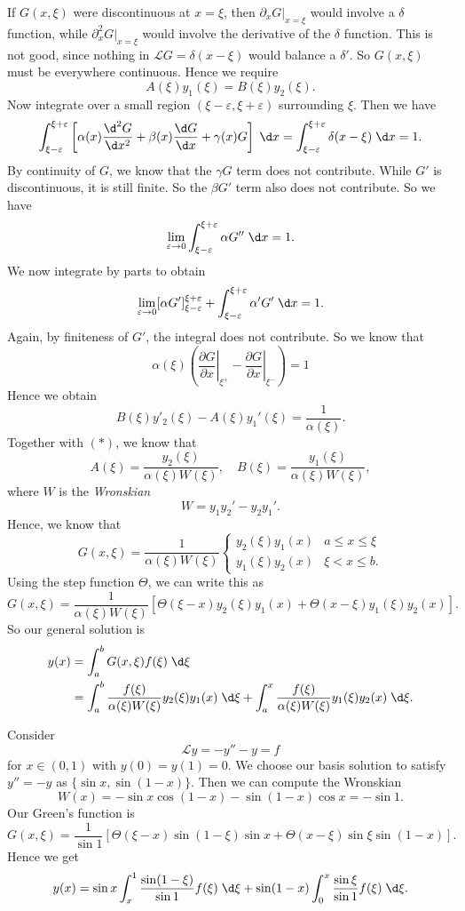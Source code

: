 \documentclass[a4paper]{article}
\begin{document}
If $G(x, \xi)$ were discontinuous at $x = \xi$, then $\partial_x G|_{x = \xi}$ would involve a $\delta$ function, while $\partial^2_x G|_{x = \xi}$ would involve the derivative of the $\delta$ function. This is not good, since nothing in $\mathcal{L}G = \delta(x - \xi)$ would balance a $\delta'$. So $G(x, \xi)$ must be everywhere continuous. Hence we require
\[
  A(\xi) y_1 (\xi) = B(\xi) y_2(\xi).\tag{$*$}
\]
Now integrate over a small region $(\xi - \varepsilon, \xi + \varepsilon)$ surrounding $\xi$. Then we have
\[
  \int_{\xi - \varepsilon}^{\xi + \varepsilon} \left[\alpha(x) \frac{\d^2 G}{\d x^2} + \beta(x) \frac{\d G}{\d x} + \gamma(x) G\right]\;\d x = \int_{\xi - \varepsilon}^{\xi + \varepsilon} \delta(x - \xi)\;\d x = 1.
\]
By continuity of $G$, we know that the $\gamma G$ term does not contribute. While $G'$ is discontinuous, it is still finite. So the $\beta G'$ term also does not contribute. So we have
\[
  \lim_{\varepsilon \to 0} \int_{\xi - \varepsilon}^{\xi + \varepsilon} \alpha G'' \;\d x = 1.
\]
We now integrate by parts to obtain
\[
  \lim_{\varepsilon \to 0} [\alpha G']^{\xi + \varepsilon}_{\xi - \varepsilon} + \int_{\xi - \varepsilon}^{\xi + \varepsilon} \alpha' G' \;\d x = 1.
\]
Again, by finiteness of $G'$, the integral does not contribute. So we know that
\[
  \alpha(\xi)\left(\left.\frac{\partial G}{\partial x}\right|_{\xi^+} - \left.\frac{\partial G}{\partial x}\right|_{\xi^-}\right) = 1
\]
Hence we obtain
\[
  B(\xi) y'_2 (\xi) - A(\xi) y_1'(\xi) = \frac{1}{\alpha(\xi)}.
\]
Together with $(*)$, we know that
\[
  A(\xi) = \frac{y_2(\xi)}{\alpha(\xi) W(\xi)},\quad B(\xi) = \frac{y_1(\xi)}{\alpha(\xi)W(\xi)},
\]
where $W$ is the \emph{Wronskian}
\[
  W = y_1 y_2' - y_2y_1'.
\]
Hence, we know that
\[
  G(x, \xi) = \frac{1}{\alpha(\xi)W(\xi)}
  \begin{cases}
    y_2(\xi) y_1(x) & a \leq x \leq \xi\\
    y_1(\xi) y_2(x) & \xi < x \leq b.
  \end{cases}
\]
Using the step function $\Theta$, we can write this as
\[
  G(x, \xi) = \frac{1}{\alpha(\xi)W(\xi)} [\Theta (\xi - x) y_2(\xi)y_1(x) + \Theta(x - \xi)y_1(\xi)y_2(x)].
\]
So our general solution is
\begin{align*}
  y(x) &= \int_a^b G(x, \xi) f(\xi)\;\d \xi\\
  &= \int_a^b \frac{f(\xi)}{\alpha(\xi)W(\xi)} y_2(\xi) y_1(x)\;\d \xi + \int_a^x \frac{f(\xi)}{\alpha(\xi)W(\xi)}y_1(\xi) y_2(x)\;\d \xi.
\end{align*}

\begin{eg}
  Consider
  \[
    \mathcal{L}y= -y'' - y = f
  \]
  for $x \in (0, 1)$ with $y(0) = y(1) = 0$. We choose our basis solution to satisfy $y'' = -y$ as $\{\sin x, \sin (1 - x)\}$. Then we can compute the Wronskian
  \[
    W(x) = -\sin x \cos(1 - x) - \sin (1 - x) \cos x = -\sin 1.
  \]
  Our Green's function is
  \[
    G(x, \xi) = \frac{1}{\sin 1}[\Theta(\xi - x) \sin (1 - \xi) \sin x + \Theta(x - \xi) \sin \xi \sin (1 - x)].
  \]
  Hence we get
  \[
    y(x) = \sin x \int_{x}^1 \frac{\sin (1 - \xi)}{ \sin 1}f(\xi) \;\d \xi + \sin(1 - x)\int_0^x \frac{\sin \xi}{\sin 1}f(\xi)\;\d \xi.
  \]
\end{eg}
\end{document}
